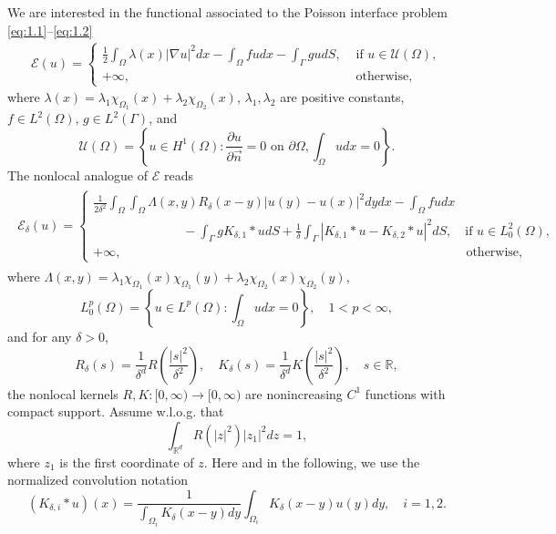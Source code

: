 \documentclass{article}
\newcommand{\R}{\mathbb{R}}
\theoremstyle{definition}
\begin{document}
We are interested in the functional associated to the Poisson interface problem \eqref{eq:1.1}--\eqref{eq:1.2}
\begin{align}\label{eq:energy_local}
\mathcal{E}(u)=
\begin{cases}
  \frac{1}{2}\int_{\Omega}\lambda(x)|\nabla u|^2dx
  -\int_{\Omega}fudx -\int_\Gamma gudS, &\mbox{ if } u\in\mathcal{U}(\Omega),\\
  +\infty, &\mbox{ otherwise},
\end{cases}
\end{align}
where $\lambda(x)=\lambda_1\chi_{\Omega_1}(x)+\lambda_2\chi_{\Omega_2}(x)$,
$\lambda_1,\lambda_2$ are positive constants, $f\in L^2(\Omega)$, $g\in L^2(\Gamma)$, and
\[
\mathcal{U}(\Omega)=\left\{u\in H^1(\Omega): \frac{\partial u}{\partial\vec{n}}=0 \mbox{ on } \partial\Omega, \int_{\Omega} udx=0\right\}.
\]
The nonlocal analogue of $\mathcal{E}$ reads
\begin{align}\label{eq:energy_nonlocal}
\begin{split}
  \mathcal{E}_\delta(u)=
  \begin{cases}
     \frac{1}{2\delta^2}\int_\Omega\int_\Omega \Lambda(x,y) R_\delta(x-y)|u(y)-u(x)|^2dydx-\int_{\Omega}fudx\\
\qquad\qquad\qquad\quad
- \int_\Gamma g K_{\delta,1}\ast u dS
+\frac{1}{\delta}
\int_\Gamma\left|K_{\delta,1}\ast u-K_{\delta,2}\ast u\right|^2dS,
\quad\mbox{if } u\in L^2_0(\Omega), \\
 +\infty,  \qquad\qquad\qquad\qquad\qquad\qquad\qquad\qquad\qquad\qquad\qquad
    \qquad\qquad\quad\mbox{otherwise},
  \end{cases}
\end{split}
\end{align}
where $\Lambda(x,y)=\lambda_1\chi_{\Omega_1}(x)\chi_{\Omega_1}(y)
+\lambda_2\chi_{\Omega_2}(x)\chi_{\Omega_2}(y)$,
\[
L^p_0(\Omega)=\left\{u\in L^p(\Omega): \int_{\Omega}udx=0\right\}, \quad 1<p<\infty,
\]
and for any $\delta>0$,
\[
R_\delta(s)=\frac{1}{\delta^d}R\left(\frac{|s|^2}{\delta^2}\right),\quad
K_\delta(s)=\frac{1}{\delta^d}K\left(\frac{|s|^2}{\delta^2}\right),
\quad s\in\R,
\]
the nonlocal kernels $R, K: [0,\infty)\rightarrow [0,\infty)$ are nonincreasing $C^1$ functions with compact support.
Assume w.l.o.g. that
\[
  \int_{\R^d}R(|z|^2)|z_1|^2dz=1,
\]
where $z_1$ is the first coordinate of $z$.
Here and in the following, we use the normalized convolution notation
\[
\left(K_{\delta,i}\ast u\right)(x)
=\frac{1}{\int_{\Omega_i}K_\delta(x-y)dy}\int_{\Omega_i}K_\delta(x-y)u(y)dy,\quad i=1,2.
\]
\end{document}
